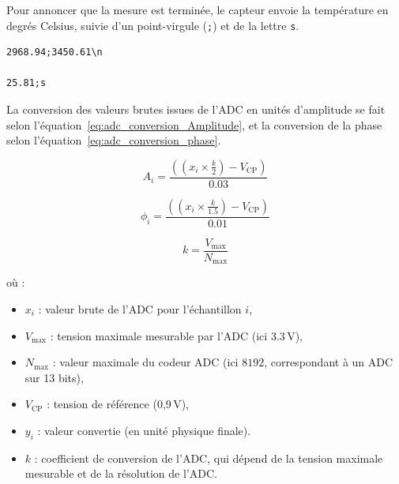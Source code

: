 Pour annoncer que la mesure est terminée, le capteur envoie la température en degrés Celsius, suivie d’un point-virgule (\texttt{;}) et de la lettre \texttt{s}.

\begin{verbatim}
2968.94;3450.61\n

25.81;s
\end{verbatim}

La conversion des valeurs brutes issues de l'ADC en unités d'amplitude se fait selon l'équation~\ref{eq:adc_conversion_Amplitude}, et la conversion de la phase selon l'équation~\ref{eq:adc_conversion_phase}.

\begin{equation}
A_i = \frac{\left( \left( x_i \times \frac{k}{2} \right) - V_{\text{CP}} \right)}{0.03}
\label{eq:adc_conversion_Amplitude}
\end{equation}

\begin{equation}
\phi_i = \frac{\left( \left( x_i \times \frac{k}{1.5} \right) - V_{\text{CP}} \right)}{0.01}
\label{eq:adc_conversion_phase}
\end{equation}

\begin{equation}
k = \frac{V_{\text{max}}}{N_{\text{max}}}
\label{eq:adc_conversion}
\end{equation}

où :
\begin{itemize}[label=\textbullet]
    \item $x_i$ : valeur brute de l'ADC pour l'échantillon $i$,
    \item $V_{\text{max}}$ : tension maximale mesurable par l'ADC (ici $3.3\,\mathrm{V}$),
    \item $N_{\text{max}}$ : valeur maximale du codeur ADC (ici $8192$, correspondant à un ADC sur 13 bits),
    \item $V_{\text{CP}}$ : tension de référence (0,9\,V),
    \item $y_i$ : valeur convertie (en unité physique finale).
    \item $k$ : coefficient de conversion de l'ADC, qui dépend de la tension maximale mesurable et de la résolution de l'ADC.   
\end{itemize}
\newpage
